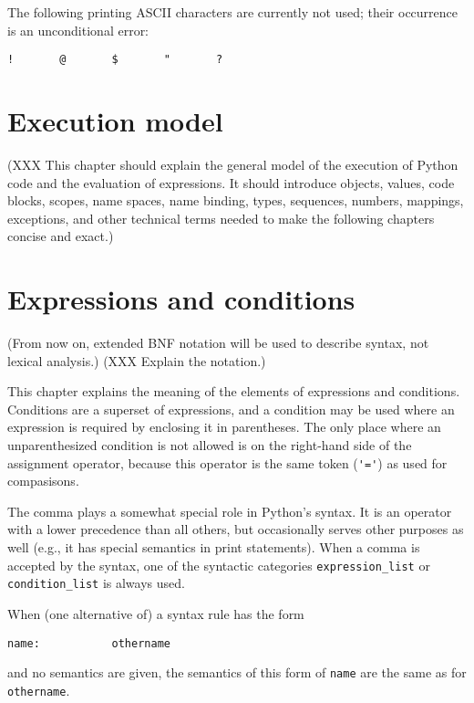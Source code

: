 The following printing ASCII characters are currently not used;
their occurrence is an unconditional error:

\begin{verbatim}
!       @       $       "       ?
\end{verbatim}

\chapter{Execution model}

(XXX This chapter should explain the general model
of the execution of Python code and
the evaluation of expressions.
It should introduce objects, values, code blocks, scopes, name spaces,
name binding,
types, sequences, numbers, mappings,
exceptions, and other technical terms needed to make the following
chapters concise and exact.)

\chapter{Expressions and conditions}

(From now on, extended BNF notation will be used to describe
syntax, not lexical analysis.)
(XXX Explain the notation.)

This chapter explains the meaning of the elements of expressions and
conditions.  Conditions are a superset of expressions, and a condition
may be used where an expression is required by enclosing it in
parentheses.  The only place where an unparenthesized condition
is not allowed is on the right-hand side of the assignment operator,
because this operator is the same token (\verb/'='/) as used for
compasisons.

The comma plays a somewhat special role in Python's syntax.
It is an operator with a lower precedence than all others, but
occasionally serves other purposes as well (e.g., it has special
semantics in print statements).  When a comma is accepted by the
syntax, one of the syntactic categories \verb/expression_list/
or \verb/condition_list/ is always used.

When (one alternative of) a syntax rule has the form

\begin{verbatim}
name:           othername
\end{verbatim}

and no semantics are given, the semantics of this form of \verb/name/
are the same as for \verb/othername/.

